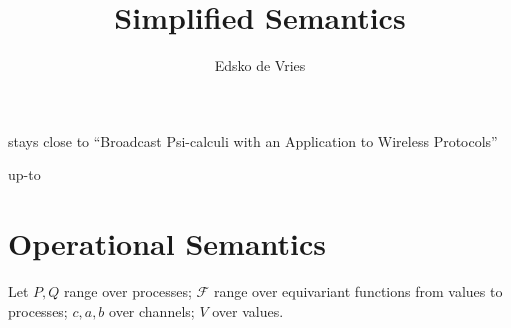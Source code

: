 \documentclass{article}
\begin{document}
\title{Simplified Semantics}
\author{Edsko de Vries}
\maketitle

\cite{Borgström2015}
stays close to ``Broadcast Psi-calculi with an Application to Wireless Protocols''

\cite{AmanPohjola:2016:BUT:2854065.2854080} up-to

\section*{Operational Semantics}

Let $P, Q$ range over processes; $\mathcal{F}$ range over equivariant functions
from values to processes; $c, a, b$ over channels; $V$ over values.
\end{document}
